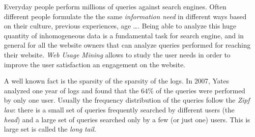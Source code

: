 
Everyday people perform millions of queries against search engines. Often different people formulate
the the same \emph{information need} in different ways based on their culture, previous experiences,
age \dots. Being able to analyze this huge quantity of inhomogeneous data is a fundamental 
task for search engine, and in general for all the website owners that can analyze queries 
performed for reaching their website. \emph{Web Usage Mining} allows 
to study the user needs in order to improve the user satisfaction an engagement on the website. 

A well known fact is the sparsity of the sparsity of the logs. In 2007, Yates \etal\cite{baeza2007impact} 
analyzed one year of logs and found that the $64\%$ of the queries were performed by only one user.
Usually the frequency distribution of the queries follow the \emph{Zipf law}: there is a small 
set of queries frequently searched by different users (the \emph{head}) and a large set of queries
searched only by a few (or just one) users. This is large set is called the \emph{long tail}.